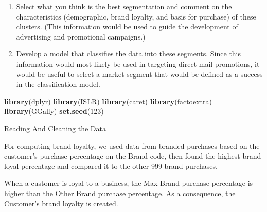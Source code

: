 \documentclass[
]{article}
\newenvironment{Shaded}{\begin{snugshade}}{\end{snugshade}}
\newcommand{\ControlFlowTok}[1]{\textcolor[rgb]{0.13,0.29,0.53}{\textbf{#1}}}
\newcommand{\DecValTok}[1]{\textcolor[rgb]{0.00,0.00,0.81}{#1}}
\newcommand{\KeywordTok}[1]{\textcolor[rgb]{0.13,0.29,0.53}{\textbf{#1}}}
\newcommand{\NormalTok}[1]{#1}
\newcommand{\StringTok}[1]{\textcolor[rgb]{0.31,0.60,0.02}{#1}}
\begin{document}
\begin{enumerate}
\def\labelenumi{\arabic{enumi}.}
\setcounter{enumi}{1}
\item
  Select what you think is the best segmentation and comment on the
  characteristics (demographic, brand loyalty, and basis for purchase)
  of these clusters. (This information would be used to guide the
  development of advertising and promotional campaigns.)
\item
  Develop a model that classifies the data into these segments. Since
  this information would most likely be used in targeting direct-mail
  promotions, it would be useful to select a market segment that would
  be defined as a success in the classification model.
\end{enumerate}

\begin{Shaded}
\begin{Highlighting}[]
\KeywordTok{library}\NormalTok{(dplyr)}
\KeywordTok{library}\NormalTok{(ISLR)}
\KeywordTok{library}\NormalTok{(caret)}
\KeywordTok{library}\NormalTok{(factoextra)}
\KeywordTok{library}\NormalTok{(GGally)}
\KeywordTok{set.seed}\NormalTok{(}\DecValTok{123}\NormalTok{)}
\end{Highlighting}
\end{Shaded}

Reading And Cleaning the Data

\begin{Shaded}
\end{Shaded}

For computing brand loyalty, we used data from branded purchases based
on the customer's purchase percentage on the Brand code, then found the
highest brand loyal percentage and compared it to the other 999 brand
purchases.

When a customer is loyal to a business, the Max Brand purchase
percentage is higher than the Other Brand purchase percentage. As a
consequence, the Customer's brand loyalty is created.
\end{document}
